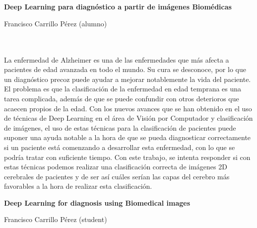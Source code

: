 \chapter*{}






\cleardoublepage
\thispagestyle{empty}

\begin{center}
{\large\bfseries Deep Learning para diagnóstico a partir de imágenes Biomédicas}\\
\end{center}
\begin{center}
Francisco Carrillo Pérez (alumno)\\
\end{center}

\\

\vspace{0.7cm}
\\

La enfermedad de Alzheimer es una de las enfermedades que más afecta a pacientes de edad avanzada en todo el mundo. Su cura se desconoce, por lo que un diagnóstico precoz puede ayudar a mejorar notablemente la vida del paciente. El problema es que la clasificación de la enfermedad en edad temprana es una tarea complicada, además de que se puede confundir con otros deterioros que acaecen propios de la edad. Con los nuevos avances que se han obtenido en el uso de técnicas de Deep Learning en el área de Visión por Computador y clasificación de imágenes, el uso de estas técnicas para la clasificación de pacientes puede suponer una ayuda notable a la hora de que se pueda diagnosticar correctamente si un paciente está comenzando a desarrollar esta enfermedad, con lo que se podría tratar con suficiente tiempo. Con este trabajo, se intenta responder si con estas técnicas podemos realizar una clasificación correcta de imágenes 2D cerebrales de pacientes y de ser así cuáles serían las capas del cerebro más favorables a la hora de realizar esta clasificación.
\cleardoublepage


\thispagestyle{empty}


\begin{center}
{\large\bfseries Deep Learning for diagnosis using Biomedical images}\\
\end{center}
\begin{center}
Francisco Carrillo Pérez (student)\\
\end{center}

